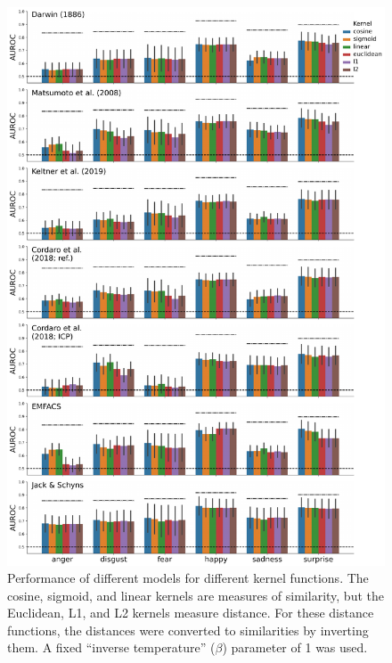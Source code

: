 \documentclass[11pt,american,a4paper,oneside,]{memoir} %
\begin{document}
\begin{figure}
\centering
\includegraphics{_bookdown_files/hypothesis-kernel-analysis-files/figures/figure_S3.pdf}
\caption{\label{fig:fig-hka-S3}Performance of different models for different kernel functions. The cosine, sigmoid, and linear kernels are measures of similarity, but the Euclidean, L1, and L2 kernels measure distance. For these distance functions, the distances were converted to similarities by inverting them. A fixed ``inverse temperature'' (\(\beta\)) parameter of 1 was used.}
\end{figure}
\end{document}
